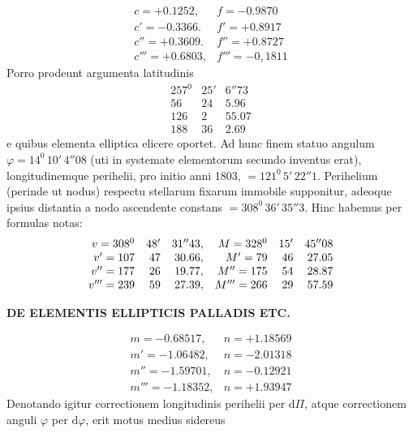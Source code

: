 \[
\begin{array}{ll}
c=+0.1252,&f=-0.9870\\
c'=-0.3366.&f'=+0.8917\\
c''=+0.3609.&f''=+0.8727\\
c'''=+0.6803,&f'''=-0{,}1811
\end{array}
\]
Porro prodeunt argumenta latitudinis
\[
\begin{array}{rrr}
257^0&25'&6''73\\
56&24&5.96\\
126&2&55.07\\
188&36&2.69
\end{array}
\]
e quibus elementa elliptica elicere oportet. Ad hunc finem statuo angulum $\varphi=14^0\,10'\,4''08$ (uti in systemate elementorum secundo inventus erat), longitudinemque perihelii, pro initio anni 1803, $=121^0\,5'\,22''1$. Perihelium (perinde ut nodus) respectu stellarum fixarum immobile supponitur, adeoque ipsius distantia a nodo ascendente constans $=308^0\,36'\,35''3$. Hinc habemus per formulas notas:
\[
\begin{array}{rrr@{\quad}rrr}
v=308^0&48'&31''43,&M=328^0&15'&45''08\\
v'=107&47&30.66,&M'=79&46&27.05\\
v''=177&26&19.77,&M''=175&54&28.87\\
v'''=239&59&27.39,&M'''=266&29&57.59
\end{array}
\]
\par\clearpage
\thispagestyle{empty}
\noindent{}%
\makebox[12mm][l]{}%
\parbox[t]{\dimexpr\linewidth-24mm\relax}{\centering\footnotesize\bfseries DE ELEMENTIS ELLIPTICIS PALLADIS ETC.\par}%
\par\nobreak\medskip
\[
\begin{array}{ll}
m=-0.68517,&n=+1.18569\\
m'=-1.06482,&n=-2.01318\\
m''=-1.59701,&n=-0.12921\\
m'''=-1.18352,&n=+1.93947
\end{array}
\]
Denotando igitur correctionem longitudinis perihelii per $\mathrm d\Pi$, atque correctionem anguli $\varphi$ per $\mathrm d\varphi$, erit motus medius sidereus


